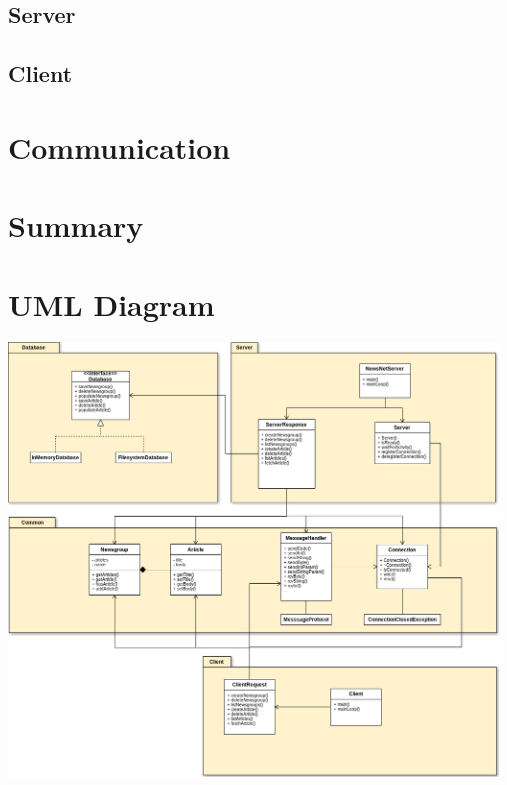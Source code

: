 \documentclass[a4paper, titlepage]{article}
\begin{document}
\subsection{Server}

\subsection{Client}

\section{Communication}\label{communication}

\section{Summary}\label{summary}

\newpage
\appendix
\section{UML Diagram}\label{App:AppendixA}
\includegraphics[width=130mm]{NewsNet_UML.png}
\end{document}
